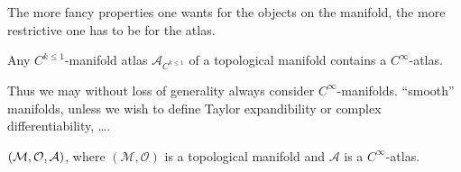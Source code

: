 \documentclass[11pt, a4paper, twocolumn]{article} %
\begin{document}
\begin{note}
    The more fancy properties one wants for the objects on the manifold, the more restrictive one
    has to be for the atlas.
\end{note}
\begin{theorem}[$C^1\to C^\infty$]
    Any $C^{k \leq 1}$-manifold atlas $\mathcal{A}_{C^{k\leq 1}}$ of a topological manifold contains
    a $C^\infty$-atlas.
\end{theorem}
Thus we may without loss of generality always consider $C^\infty$-manifolds. 
``smooth'' manifolds, unless we wish to define Taylor expandibility or complex differentiability, \ldots.
\begin{defn}
    $(\mathcal{M}, \mathcal{O}, \mathcal{A})$, where $(\mathcal{M, O})$ is a topological manifold and $\mathcal{A}$ is a $C^\infty$-atlas.
\end{defn}
\end{document}
